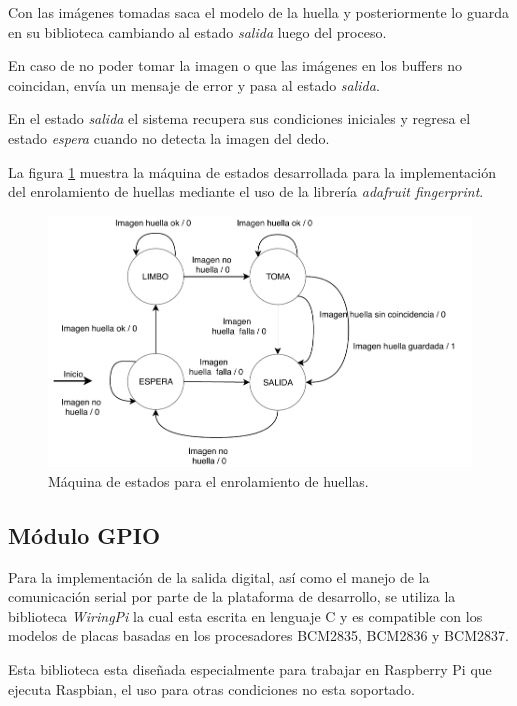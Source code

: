 Con las imágenes tomadas saca el modelo de la huella y posteriormente lo guarda en su biblioteca cambiando al estado \textit{salida} luego del proceso.

En caso de no poder tomar la imagen o que las imágenes en los buffers no coincidan, envía un mensaje de error y pasa al estado \textit{salida}.

En el estado \textit{salida} el sistema recupera sus condiciones iniciales y regresa el estado \textit{espera} cuando no detecta la imagen del dedo.

La figura \ref{fig:maquinaenrolar} muestra la máquina de estados desarrollada para la implementación del enrolamiento de huellas mediante el uso de la librería \textit{adafruit fingerprint}.

\begin{figure}[H]
	\centering
	\includegraphics[scale=1]{./Figures/maquinaenrolar.pdf}
	\caption{Máquina de estados para el enrolamiento de huellas.}
	\label{fig:maquinaenrolar}
\end{figure}
\subsection{Módulo GPIO}
Para la implementación de la salida digital, así como el manejo de la comunicación serial por parte de la plataforma de desarrollo, se utiliza la biblioteca \textit{WiringPi} la cual esta escrita en lenguaje C y es compatible con los modelos de placas basadas en los procesadores  BCM2835, BCM2836 y BCM2837.

Esta biblioteca esta diseñada especialmente para trabajar en Raspberry Pi que ejecuta Raspbian, el uso para otras condiciones no esta soportado.


